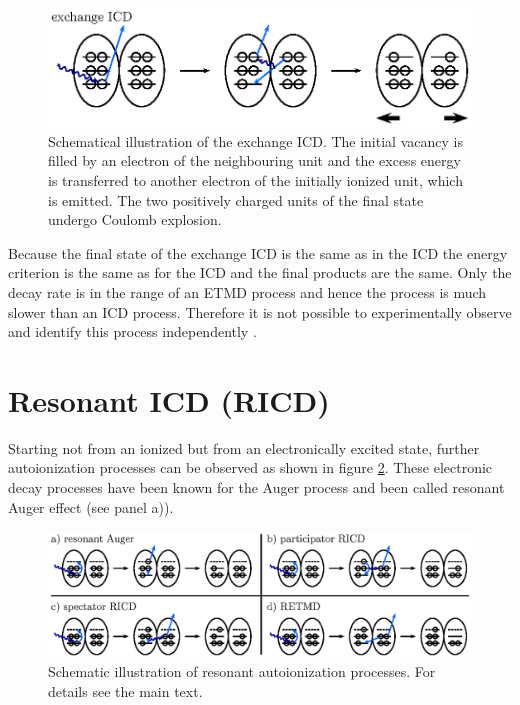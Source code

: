 \begin{figure}[h]
 \centering
 \includegraphics{pics/exicd-pspic.eps}
 \caption{Schematical illustration of the exchange \ac{ICD}. The initial
          vacancy is filled by an electron of the neighbouring unit and the
          excess energy is transferred to another electron of the initially ionized
          unit, which is emitted. The two positively charged units of the final
          state undergo Coulomb explosion.}
 \label{figure:exICD_process}
\end{figure}

Because the final state of the exchange ICD is the same as in the ICD the energy
criterion is the same as for the ICD and the final products are the same. Only
the decay rate is in the range of an ETMD process and hence the process is much
slower than an ICD process. Therefore it is not possible to experimentally
observe and identify this process independently \cite{Zobeley01}.


\section{Resonant ICD (RICD)}
Starting not from an ionized but from an electronically excited state, further
autoionization processes can be observed
as shown in figure \ref{figure:ricd_processes}.
These electronic decay processes have been known for
the Auger process and been called resonant Auger effect (see panel a)).

\begin{figure}[h]
 \centering
 \includegraphics{pics/ricd-pspic.eps}
 \caption{Schematic illustration of resonant autoionization processes.
          For details see the main text.}
 \label{figure:ricd_processes}
\end{figure}

